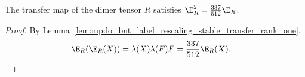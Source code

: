 \begin{lemma}
    \label{lem:mpdo_bnt_label_rescaling_stable_transfer_quasi_idempotent}
    \leanok
    The transfer map of the dimer tensor $R$ satisfies
    $\E_R^2=\frac{337}{512}\E_R$.
\end{lemma}

\begin{proof}\leanok
    By Lemma~\ref{lem:mpdo_bnt_label_rescaling_stable_transfer_rank_one},
    \begin{align}
        \E_R(\E_R(X))
         & =\lambda(X)\lambda(F)F
        =\frac{337}{512}\E_R(X).
        \notag
    \end{align}
\end{proof}

